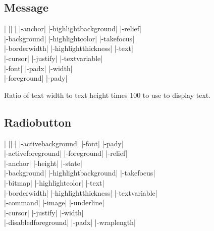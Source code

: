 \subsection*{Message}
\vspace{-4pt}

\begin{tabbing}
|                   |\=|                     |\= \kill
|-anchor|           \> |-highlightbackground| \> |-relief| \\
|-background|       \> |-highlightcolor|     \> |-takefocus| \\
|-borderwidth|      \> |-highlightthickness| \> |-text| \\
|-cursor|	    \> |-justify|            \> |-textvariable| \\
|-font|             \> |-padx|               \> |-width| \\
|-foreground|       \> |-pady| \\
\end{tabbing}

\vskip5pt
\begin{enum}{1cm}

Ratio of text width to text height times 100 to use to display text.

\end{enum}

\subsection*{Radiobutton}
\vspace{-4pt}

\begin{tabbing}
|                   |\=|                     |\= \kill
|-activebackground| \> |-font|               \> |-pady| \\
|-activeforeground| \> |-foreground|         \> |-relief| \\
|-anchor|           \> |-height|             \> |-state| \\
|-background|       \> |-highlightbackground| \> |-takefocus| \\    
|-bitmap|           \> |-highlightcolor|     \> |-text| \\        
|-borderwidth|      \> |-highlightthickness| \> |-textvariable| \\
|-command|          \> |-image|              \> |-underline| \\   
|-cursor|	    \> |-justify| 	     \> |-width| \\       
|-disabledforeground| \> |-padx| 	     \> |-wraplength| \\  
\end{tabbing}


